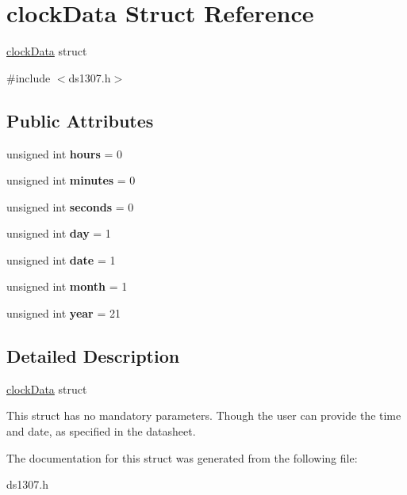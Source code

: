 \hypertarget{structclockData}{}\section{clock\+Data Struct Reference}
\label{structclockData}


\hyperlink{structclockData}{clock\+Data} struct  




{\ttfamily \#include $<$ds1307.\+h$>$}

\subsection*{Public Attributes}
\begin{DoxyCompactItemize}
\item 
\mbox{\label{structclockData_acbc7f84e9f50475c709cc99a93b643c4}} 
unsigned int {\bfseries hours} = 0
\item 
\mbox{\label{structclockData_acfebea0a47635041ac2981c3829fb23b}} 
unsigned int {\bfseries minutes} = 0
\item 
\mbox{\label{structclockData_a8ab75c671990bf5450e6a071fdec29bd}} 
unsigned int {\bfseries seconds} = 0
\item 
\mbox{\label{structclockData_af036d60d7966479e4dfd678b7b51762b}} 
unsigned int {\bfseries day} = 1
\item 
\mbox{\label{structclockData_a3f6ae065571a54e0ac4350ff25ef289b}} 
unsigned int {\bfseries date} = 1
\item 
\mbox{\label{structclockData_ab3a9dbd7560cefd2060cad9e948acac7}} 
unsigned int {\bfseries month} = 1
\item 
\mbox{\label{structclockData_ababf8ecb56e7e760e51a1ac4be374b0c}} 
unsigned int {\bfseries year} = 21
\end{DoxyCompactItemize}


\subsection{Detailed Description}
\hyperlink{structclockData}{clock\+Data} struct 

This struct has no mandatory parameters. Though the user can provide the time and date, as specified in the datasheet. 

The documentation for this struct was generated from the following file\+:\begin{DoxyCompactItemize}
\item 
ds1307.\+h\end{DoxyCompactItemize}
